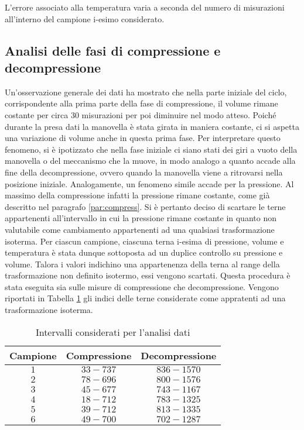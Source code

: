 \documentclass[a4paper,11pt,oneside]{article}
\begin{document}
L'errore associato alla temperatura varia a seconda del numero di misurazioni all'interno del campione i-esimo considerato. %


\subsection{Analisi delle fasi di compressione e decompressione}
Un'osservazione generale dei dati ha mostrato che nella parte iniziale del ciclo, corrispondente alla prima parte della fase di compressione, il volume rimane costante per circa 30 misurazioni per poi diminuire nel modo atteso. Poiché durante la presa dati la manovella è stata girata in maniera costante, ci si aspetta una variazione di volume anche in questa prima fase. Per interpretare questo fenomeno, si è ipotizzato che nella fase iniziale ci siano stati dei giri a vuoto della manovella o del meccanismo che la muove, in modo analogo a quanto accade alla fine della decompressione, ovvero quando la manovella viene a ritrovarsi nella posizione iniziale.
Analogamente, un fenomeno simile accade per la pressione. Al massimo della compressione infatti la pressione rimane costante, come già descritto nel paragrafo \ref{par:compress}. Si è pertanto deciso di scartare le terne appartenenti all'intervallo in cui la pressione rimane costante in quanto non valutabile come cambiamento appartenenti ad una qualsiasi trasformazione isoterma.
Per ciascun campione, ciascuna terna i-esima di pressione, volume e temperatura è stata dunque sottoposta ad un duplice controllo su pressione e volume. Talora i valori indichino una appartenenza della terna al range della trasformazione non definito isotermo, essi vengono scartati. Questa procedura è stata eseguita sia sulle misure di compressione che decompressione. Vengono riportati in Tabella \ref{tab:misure_scartate} gli indici delle terne considerate come appratenti ad una trasformazione isoterma. 
 
\begin{table}[h!]
    \centering
    \begin{tabular}{|c|c|c|}
        \hline
        \textbf{Campione} & \textbf{Compressione} & \textbf{Decompressione} \\ \hline
        \rowcolor[rgb]{0.85,0.85,0.85}$1$ & $33-737$ & $836-1570$ \\ \hline
        $2$ & $78-696$ & $800-1576$ \\ \hline
        \rowcolor[rgb]{0.85,0.85,0.85}$3$ & $45-677$ & $743-1167$ \\ \hline
        $4$ & $18-712$ & $783-1325$ \\ \hline
        \rowcolor[rgb]{0.85,0.85,0.85}$5$ & $39-712$ & $813-1335$ \\ \hline
        $6$ & $49-700$ & $702-1287$ \\ \hline
    \end{tabular}
    \caption{Intervalli considerati per l'analisi dati}
    \label{tab:misure_scartate}
\end{table}
\end{document}
